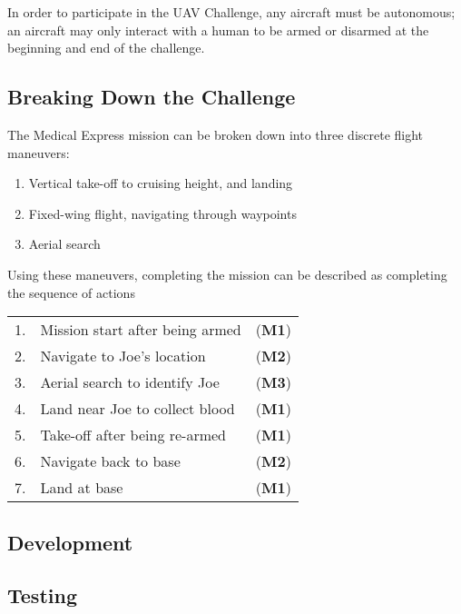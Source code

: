 In order to participate in the UAV Challenge, any aircraft must be autonomous; an aircraft may only interact with a human to be armed or disarmed at the beginning and end of the challenge.

\subsection{Breaking Down the Challenge}
\label{sec:flight}
The Medical Express mission can be broken down into three discrete flight maneuvers:
\begin{enumerate}[label=\bfseries M\arabic*:] \itemsep-2pt
	\item Vertical take-off to cruising height, and landing
	\item Fixed-wing flight, navigating through waypoints
	\item Aerial search
\end{enumerate}

Using these maneuvers, completing the mission can be described as completing the sequence of actions\\
\begin{tabular}{r l l}
	1. & Mission start after being armed & (\textbf{M1}) \\ 
	2. & Navigate to Joe's location & (\textbf{M2}) \\ 
	3. & Aerial search to identify Joe & (\textbf{M3}) \\ 
	4. & Land near Joe to collect blood & (\textbf{M1}) \\ 
	5. & Take-off after being re-armed & (\textbf{M1}) \\ 
	6. & Navigate back to base & (\textbf{M2}) \\ 
	7. & Land at base & (\textbf{M1}) \\ 
\end{tabular} 

\subsection{Development}

\subsection{Testing}
